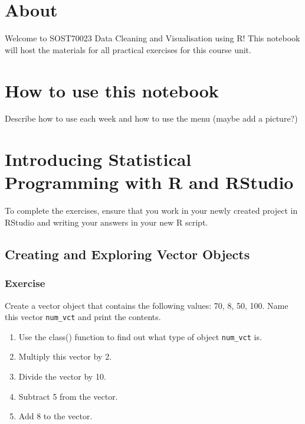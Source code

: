 \documentclass[
]{book}
\author{}
\date{\vspace{-2.5em}2024-01-26}
\providecommand{\tightlist}{%
  \setlength{\itemsep}{0pt}\setlength{\parskip}{0pt}}
\begin{document}
{
\setcounter{tocdepth}{1}
\tableofcontents
}
\hypertarget{about}{%
\chapter*{About}\label{about}}

Welcome to SOST70023 Data Cleaning and Visualisation using R! This notebook will host the materials for all practical exercises for this course unit.

\hypertarget{how-to-use-this-notebook}{%
\chapter*{How to use this notebook}\label{how-to-use-this-notebook}}

Describe how to use each week and how to use the menu (maybe add a picture?)

\hypertarget{introducing-statistical-programming-with-r-and-rstudio}{%
\chapter{Introducing Statistical Programming with R and RStudio}\label{introducing-statistical-programming-with-r-and-rstudio}}

To complete the exercises, ensure that you work in your newly created project in RStudio and writing your answers in your new R script.

\hypertarget{creating-and-exploring-vector-objects}{%
\section{Creating and Exploring Vector Objects}\label{creating-and-exploring-vector-objects}}

\hypertarget{exercise}{%
\subsection{Exercise}\label{exercise}}

Create a vector object that contains the following values: 70, 8, 50, 100. Name this vector \texttt{num\_vct} and print the contents.

\begin{enumerate}
\def\labelenumi{\alph{enumi}.}
\tightlist
\item
  Use the class() function to find out what type of object \texttt{num\_vct} is.
\item
  Multiply this vector by 2.
\item
  Divide the vector by 10.
\item
  Subtract 5 from the vector.
\item
  Add 8 to the vector.
\end{enumerate}
\end{document}

